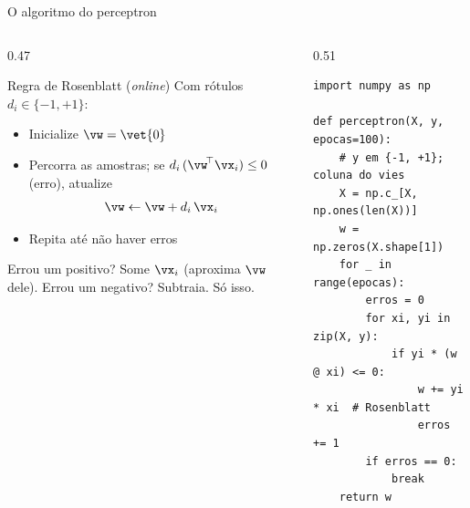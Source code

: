 \documentclass[aspectratio=169, 11pt]{beamer}
\begin{document}
\begin{frame}[fragile]{O algoritmo do perceptron}
  \begin{columns}[T]
    \begin{column}{0.47\textwidth}
      \begin{algbox}{Regra de Rosenblatt (\emph{online})}
        Com rótulos $d_i \in \{-1, +1\}$:
        \begin{itemize}\setlength{\itemsep}{0.2ex}
          \item Inicialize $\vw = \vet{0}$
          \item Percorra as amostras; se $d_i\,(\vw^{\!\top}\vx_i) \le 0$
                (erro), atualize
                \[ \vw \leftarrow \vw + d_i\, \vx_i \]
          \item Repita até não haver erros
        \end{itemize}
      \end{algbox}
      {\small Errou um positivo? Some $\vx_i$ (aproxima $\vw$ dele).
      Errou um negativo? Subtraia. Só isso.}
    \end{column}
    \begin{column}{0.51\textwidth}
\begin{lstlisting}
import numpy as np

def perceptron(X, y, epocas=100):
    # y em {-1, +1}; coluna do vies
    X = np.c_[X, np.ones(len(X))]
    w = np.zeros(X.shape[1])
    for _ in range(epocas):
        erros = 0
        for xi, yi in zip(X, y):
            if yi * (w @ xi) <= 0:
                w += yi * xi  # Rosenblatt
                erros += 1
        if erros == 0:
            break
    return w
\end{lstlisting}
    \end{column}
  \end{columns}
\end{frame}
\end{document}
